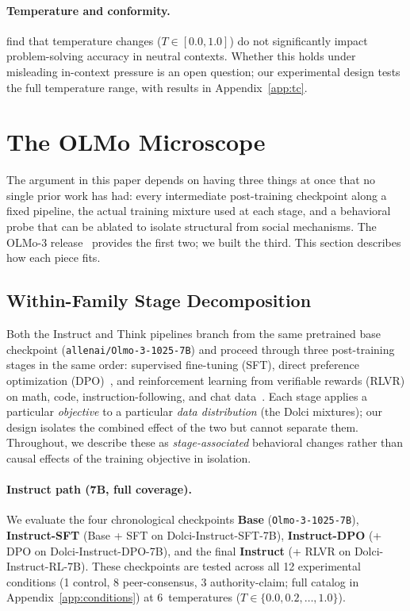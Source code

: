 \documentclass{article}
\begin{document}
\paragraph{Temperature and conformity.}
\citet{renze2024} find that temperature changes ($T \in [0.0, 1.0]$) do not significantly impact problem-solving accuracy in neutral contexts. Whether this holds under misleading in-context pressure is an open question; our experimental design tests the full temperature range, with results in Appendix~\ref{app:tc}.


\section{The OLMo Microscope}
\label{sec:method}

The argument in this paper depends on having three things at once that no single prior work has had: every intermediate post-training checkpoint along a fixed pipeline, the actual training mixture used at each stage, and a behavioral probe that can be ablated to isolate structural from social mechanisms. The OLMo-3 release~\citep{olmo3} provides the first two; we built the third. This section describes how each piece fits.

\subsection{Within-Family Stage Decomposition}
\label{sec:study1_method}

Both the Instruct and Think pipelines branch from the same pretrained base checkpoint (\texttt{allenai/Olmo-3-1025-7B}) and proceed through three post-training stages in the same order: supervised fine-tuning (SFT), direct preference optimization (DPO)~\citep{rafailov2023dpo}, and reinforcement learning from verifiable rewards (RLVR) on math, code, instruction-following, and chat data~\citep{olmo3}. Each stage applies a particular \emph{objective} to a particular \emph{data distribution} (the Dolci mixtures); our design isolates the combined effect of the two but cannot separate them. Throughout, we describe these as \emph{stage-associated} behavioral changes rather than causal effects of the training objective in isolation.

\paragraph{Instruct path (7B, full coverage).}
We evaluate the four chronological checkpoints \textbf{Base} (\texttt{Olmo-3-1025-7B}), \textbf{Instruct-SFT} (Base + SFT on Dolci-Instruct-SFT-7B), \textbf{Instruct-DPO} (+ DPO on Dolci-Instruct-DPO-7B), and the final \textbf{Instruct} (+ RLVR on Dolci-Instruct-RL-7B). These checkpoints are tested across all 12 experimental conditions (1 control, 8 peer-consensus, 3 authority-claim; full catalog in Appendix~\ref{app:conditions}) at 6~temperatures ($T \in \{0.0, 0.2, \ldots, 1.0\}$).
\end{document}
